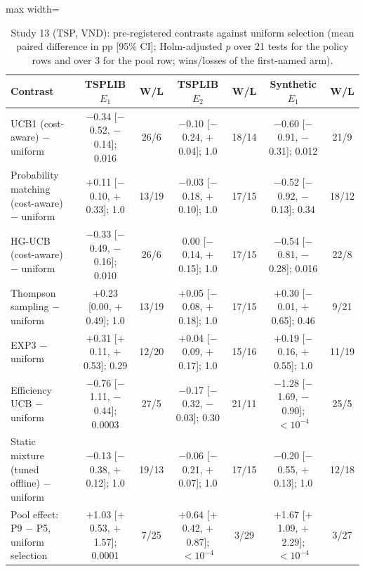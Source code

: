 \begin{table}[t]
\caption{Study 13 (TSP, VND): pre-registered contrasts against uniform selection (mean paired difference in pp [95\% CI]; Holm-adjusted $p$ over 21 tests for the policy rows and over 3 for the pool row; wins/losses of the first-named arm).}\label{tab:s13tests}
\centering
\small
\begin{adjustbox}{max width=\linewidth}
\begin{tabular}{lcccccc}
\toprule
Contrast & TSPLIB $E_1$ & W/L & TSPLIB $E_2$ & W/L & Synthetic $E_1$ & W/L \\
\midrule
UCB1 (cost-aware) $-$ uniform & $-$0.34 [$-$0.52, $-$0.14]; 0.016 & 26/6 & $-$0.10 [$-$0.24, $+$0.04]; 1.0 & 18/14 & $-$0.60 [$-$0.91, $-$0.31]; 0.012 & 21/9 \\
Probability matching (cost-aware) $-$ uniform & $+$0.11 [$-$0.10, $+$0.33]; 1.0 & 13/19 & $-$0.03 [$-$0.18, $+$0.10]; 1.0 & 17/15 & $-$0.52 [$-$0.92, $-$0.13]; 0.34 & 18/12 \\
HG-UCB (cost-aware) $-$ uniform & $-$0.33 [$-$0.49, $-$0.16]; 0.010 & 26/6 & 0.00 [$-$0.14, $+$0.15]; 1.0 & 17/15 & $-$0.54 [$-$0.81, $-$0.28]; 0.016 & 22/8 \\
Thompson sampling $-$ uniform & $+$0.23 [0.00, $+$0.49]; 1.0 & 13/19 & $+$0.05 [$-$0.08, $+$0.18]; 1.0 & 17/15 & $+$0.30 [$-$0.01, $+$0.65]; 0.46 & 9/21 \\
EXP3 $-$ uniform & $+$0.31 [$+$0.11, $+$0.53]; 0.29 & 12/20 & $+$0.04 [$-$0.09, $+$0.17]; 1.0 & 15/16 & $+$0.19 [$-$0.16, $+$0.55]; 1.0 & 11/19 \\
Efficiency UCB $-$ uniform & $-$0.76 [$-$1.11, $-$0.44]; 0.0003 & 27/5 & $-$0.17 [$-$0.32, $-$0.03]; 0.30 & 21/11 & $-$1.28 [$-$1.69, $-$0.90]; \ensuremath{<10^{-4}} & 25/5 \\
Static mixture (tuned offline) $-$ uniform & $-$0.13 [$-$0.38, $+$0.12]; 1.0 & 19/13 & $-$0.06 [$-$0.21, $+$0.07]; 1.0 & 17/15 & $-$0.20 [$-$0.55, $+$0.13]; 1.0 & 12/18 \\
\addlinespace
Pool effect: P9 $-$ P5, uniform selection & $+$1.03 [$+$0.53, $+$1.57]; 0.0001 & 7/25 & $+$0.64 [$+$0.42, $+$0.87]; \ensuremath{<10^{-4}} & 3/29 & $+$1.67 [$+$1.09, $+$2.29]; \ensuremath{<10^{-4}} & 3/27 \\
\bottomrule
\end{tabular}
\end{adjustbox}
\end{table}

